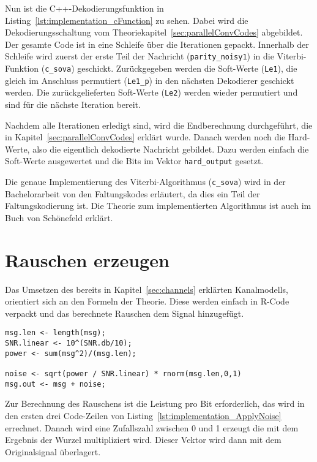 Nun ist die C++-Dekodierungsfunktion in Listing~\ref{lst:implementation_cFunction} zu sehen. Dabei wird die Dekodierungsschaltung vom Theoriekapitel~\ref{sec:parallelConvCodes} abgebildet. Der gesamte Code ist in eine Schleife über die Iterationen gepackt. Innerhalb der Schleife wird zuerst der erste Teil der Nachricht (\texttt{parity\_noisy1}) in die Viterbi-Funktion (\texttt{c\_sova}) geschickt. Zurückgegeben werden die Soft-Werte (\texttt{Le1}), die gleich im Anschluss permutiert (\texttt{Le1\_p}) in den nächsten Dekodierer geschickt werden. Die zurückgelieferten Soft-Werte (\texttt{Le2}) werden wieder permutiert und sind für die nächste Iteration bereit.

Nachdem alle Iterationen erledigt sind, wird die Endberechnung durchgeführt, die in Kapitel~\ref{sec:parallelConvCodes} erklärt wurde. Danach werden noch die Hard-Werte, also die eigentlich dekodierte Nachricht gebildet. Dazu werden einfach die Soft-Werte ausgewertet und die Bits im Vektor \texttt{hard\_output} gesetzt.

Die genaue Implementierung des Viterbi-Algorithmus (\texttt{c\_sova}) wird in der Bachelorarbeit von den Faltungskodes \cite{nocker} erläutert, da dies ein Teil der Faltungskodierung ist. Die Theorie zum implementierten Algorithmus ist auch im Buch von Schönefeld \cite[222-233]{schoenfeld2012informations} erklärt.

\FloatBarrier
\section{Rauschen erzeugen}
\label{sec:implementation_applyNoise}
Das Umsetzen des bereits in Kapitel~\ref{sec:channels} erklärten Kanalmodells, orientiert sich an den Formeln der Theorie. Diese werden einfach in R-Code verpackt und das berechnete Rauschen dem Signal hinzugefügt.  

\begin{lstlisting}[caption=Implementierung von \texttt{ApplyNoise}, label={lst:implementation_ApplyNoise}, float=!th]
msg.len <- length(msg);
SNR.linear <- 10^(SNR.db/10);
power <- sum(msg^2)/(msg.len); 

noise <- sqrt(power / SNR.linear) * rnorm(msg.len,0,1)
msg.out <- msg + noise;
\end{lstlisting}

Zur Berechnung des Rauschens ist die Leistung pro Bit erforderlich, das wird in den ersten drei Code-Zeilen von Listing~\ref{lst:implementation_ApplyNoise} errechnet. Danach wird eine Zufallszahl zwischen 0 und 1 erzeugt die mit dem Ergebnis der Wurzel multipliziert wird. Dieser Vektor wird dann mit dem Originalsignal überlagert.

